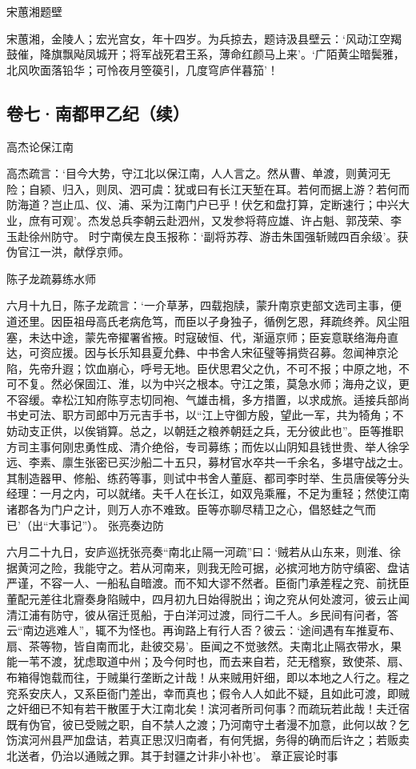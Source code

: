 \documentclass[]{article}
\begin{document}
宋蕙湘题壁

宋蕙湘，金陵人；宏光宫女，年十四岁。为兵掠去，题诗汲县壁云：`风动江空羯鼓催，降旗飘飐凤城开；将军战死君王系，薄命红颜马上来'。`广陌黄尘暗鬓雅，北风吹面落铅华；可怜夜月箜篌引，几度穹庐伴暮笳'！

\hypertarget{header-n47}{%
\subsection{卷七·南都甲乙纪（续）}\label{header-n47}}

高杰论保江南

高杰疏言：`目今大势，守江北以保江南，人人言之。然从曹、单渡，则黄河无险；自颍、归入，则凤、泗可虞：犹或曰有长江天堑在耳。若何而据上游？若何而防海道？岂止瓜、仪、浦、采为江南门户已乎！伏乞和盘打算，定断速行；中兴大业，庶有可观'。杰发总兵李朝云赴泗州，又发参将蒋应雄、许占魁、郭茂荣、李玉赴徐州防守。
时宁南侯左良玉报称：`副将苏荐、游击朱国强斩贼四百余级'。获伪官江一洪，献俘京师。

陈子龙疏募练水师

六月十九日，陈子龙疏言：`一介草茅，四载抱牍，蒙升南京吏部文选司主事，便道还里。因臣祖母高氏老病危笃，而臣以孑身独子，循例乞恩，拜疏终养。风尘阻塞，未达中途，蒙先帝擢署省掖。时寇破恒、代，渐逼京师；臣妄意联络海舟直达，可资应援。因与长乐知县夏允彝、中书舍人宋征璧等捐赀召募。忽闻神京沦陷，先帝升遐；饮血崩心，呼号无地。臣伏思君父之仇，不可不报；中原之地，不可不复。然必保固江、淮，以为中兴之根本。守江之策，莫急水师；海舟之议，更不容缓。幸松江知府陈亨志切同袍、气雄击楫，多方措置，以求成旅。适接兵部尚书史可法、职方司郎中万元吉手书，以``江上守御方殷，望此一军，共为犄角；不妨动支正供，以俟销算。总之，以朝廷之粮养朝廷之兵，无分彼此也''。臣等推职方司主事何刚忠勇性成、清介绝俗，专司募练；而佐以山阴知县钱世贵、举人徐孚远、李素、廪生张密已买沙船二十五只，募材官水卒共一千余名，多堪守战之士。其制造器甲、修船、练药等事，则试中书舍人董庭、都司李时举、生员唐侯等分头经理：一月之内，可以就绪。夫千人在长江，如双凫乘雁，不足为重轻；然使江南诸郡各为门户之计，则万人亦不难致。臣等亦聊尽精卫之心，倡怒蛙之气而已'（出``大事记''）。
张亮奏边防

六月二十九日，安庐巡抚张亮奏``南北止隔一河疏''曰：`贼若从山东来，则淮、徐据黄河之险，我能守之。若从河南来，则我无险可据，必摈河地方防守缜密、盘诘严谨，不容一人、一船私自暗渡。而不知大谬不然者。臣衙门承差程之兖、前抚臣董配元差往北齎奏身陷贼中，四月初九日始得脱出；询之兖从何处渡河，彼云止闻清江浦有防守，彼从宿迁觅船，于白洋河过渡，同行二千人。乡民间有问者，答云``南边逃难人''，辄不为怪也。再询路上有行人否？彼云：`途间遇有车推夏布、扇、茶等物，皆自南而北，赴彼交易'。臣闻之不觉骇然。夫南北止隔衣带水，果能一苇不渡，犹虑取道中州；及今何时也，而去来自若，茫无稽察，致使茶、扇、布箱得饱载而往，于贼巢行垄断之计哉！从来贼用奸细，即以本地之人行之。程之兖系安庆人，又系臣衙门差出，幸而真也；假令人人如此不疑，且如此可渡，即贼之奸细已不知有若干散匿于大江南北矣！滨河者所司何事？而疏玩若此哉！夫迁宿既有伪官，彼已受贼之职，自不禁人之渡；乃河南守土者漫不加意，此何以故？乞饬滨河州县严加盘诘，若真正思汉归南者，有何凭据，务得的确而后许之；若贩卖北送者，仍治以通贼之罪。其于封疆之计非小补也'。
章正宸论时事
\end{document}
